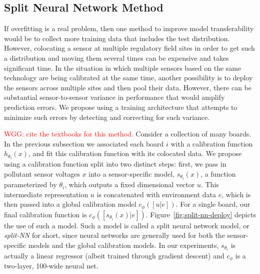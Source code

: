 \documentclass[journal abbreviation, manuscript]{copernicus}
\newcommand\todo[1]{\textcolor{red}{#1}}
\begin{document}

\subsection{Split Neural Network Method}\label{sec:split-nn}
If overfitting is a real problem, then one method to improve model transferability would be to collect more training data that includes the test distribution. However, colocating a sensor at multiple regulatory field sites in order to get such a distribution and moving them several times can be expensive and takes significant time.  In the situation in which multiple sensors based on the same technology are being calibrated at the same time, another possibility is to deploy the sensors across multiple sites and then pool their data.  However, there can be substantial sensor-to-sensor variance in performance that would amplify prediction errors.  We propose using a training architecture that attempts to minimize such errors by detecting and correcting for such variance.

\todo{WGG: cite the textbooks for this method.} Consider a collection of many boards. In the previous subsection we associated each board $i$ with a calibration function $h_{\theta_i}(x)$, and fit this calibration function with its colocated data.  We propose using a calibration function split into two distinct steps: first, we pass in pollutant sensor voltages $x$ into a sensor-specific model, $s_{\theta_i}(x)$, a function parameterized by $\theta_i$, which outputs a fixed dimensional vector $u$. This intermediate representation $u$ is concatenated with environment data $e$, which is then passed into a global calibration model $c_\phi([u | e])$. For a single board, our final calibration function is $c_\phi([s_{\theta_i}(x) | e])$.  Figure~\ref{fig:split-nn-deploy} depicts the use of such a model.  Such a model is called a split neural network model, or \textit{split-NN} for short, since neural networks are generally used for both the sensor-specific models and the global calibration models. In our experiments, $s_{\theta_i}$ is actually a linear regressor (albeit trained through gradient descent) and $c_\phi$ is a two-layer, 100-wide neural net. 
\end{document}
